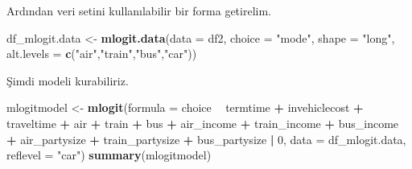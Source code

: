 \documentclass[
]{book}
\newenvironment{Shaded}{\begin{snugshade}}{\end{snugshade}}
\newcommand{\DataTypeTok}[1]{\textcolor[rgb]{0.13,0.29,0.53}{#1}}
\newcommand{\DecValTok}[1]{\textcolor[rgb]{0.00,0.00,0.81}{#1}}
\newcommand{\KeywordTok}[1]{\textcolor[rgb]{0.13,0.29,0.53}{\textbf{#1}}}
\newcommand{\NormalTok}[1]{#1}
\newcommand{\OperatorTok}[1]{\textcolor[rgb]{0.81,0.36,0.00}{\textbf{#1}}}
\newcommand{\StringTok}[1]{\textcolor[rgb]{0.31,0.60,0.02}{#1}}
\begin{document}
Ardından veri setini kullanılabilir bir forma getirelim.

\begin{Shaded}
\begin{Highlighting}[]
\NormalTok{df_mlogit.data <-}\StringTok{ }\KeywordTok{mlogit.data}\NormalTok{(}\DataTypeTok{data =}\NormalTok{ df2, }\DataTypeTok{choice =} \StringTok{"mode"}\NormalTok{, }\DataTypeTok{shape =} \StringTok{"long"}\NormalTok{, }\DataTypeTok{alt.levels =} \KeywordTok{c}\NormalTok{(}\StringTok{"air"}\NormalTok{,}\StringTok{"train"}\NormalTok{,}\StringTok{"bus"}\NormalTok{,}\StringTok{"car"}\NormalTok{))}
\end{Highlighting}
\end{Shaded}

Şimdi modeli kurabiliriz.

\begin{Shaded}
\begin{Highlighting}[]
\NormalTok{mlogitmodel <-}\StringTok{ }\KeywordTok{mlogit}\NormalTok{(}\DataTypeTok{formula =}\NormalTok{ choice }\OperatorTok{~}\StringTok{ }\NormalTok{termtime }\OperatorTok{+}\StringTok{ }\NormalTok{invehiclecost }\OperatorTok{+}\StringTok{ }\NormalTok{traveltime }\OperatorTok{+}\StringTok{ }\NormalTok{air }\OperatorTok{+}\StringTok{ }\NormalTok{train }\OperatorTok{+}\StringTok{ }\NormalTok{bus }\OperatorTok{+}\StringTok{ }\NormalTok{air_income }\OperatorTok{+}\StringTok{ }\NormalTok{train_income }\OperatorTok{+}\StringTok{ }\NormalTok{bus_income }\OperatorTok{+}\StringTok{ }\NormalTok{air_partysize }\OperatorTok{+}\StringTok{ }\NormalTok{train_partysize }\OperatorTok{+}\StringTok{ }\NormalTok{bus_partysize }\OperatorTok{|}\StringTok{ }\DecValTok{0}\NormalTok{, }\DataTypeTok{data =}\NormalTok{ df_mlogit.data, }\DataTypeTok{reflevel =} \StringTok{"car"}\NormalTok{)}
\KeywordTok{summary}\NormalTok{(mlogitmodel)}
\end{Highlighting}
\end{Shaded}
\end{document}
